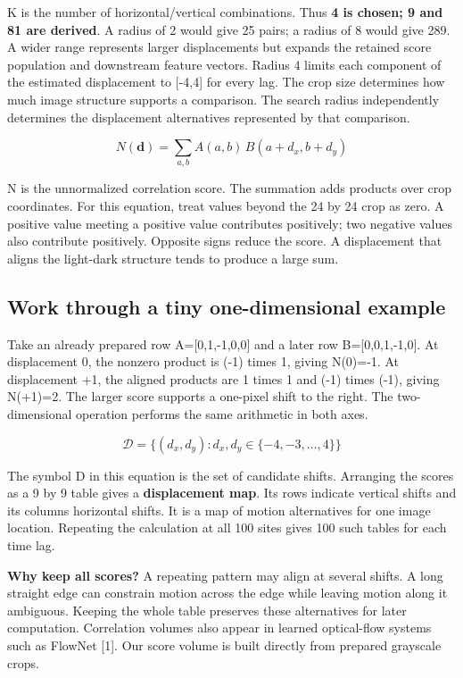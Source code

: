 \documentclass[11pt,letterpaper]{article}
\begin{document}
K is the number of horizontal/\allowbreak{}vertical combinations. Thus \textbf{4 is chosen; 9 and 81 are derived}. A radius of 2 would give 25 pairs; a radius of 8 would give 289. A wider range represents larger displacements but expands the retained score population and downstream feature vectors. Radius 4 limits each component of the estimated displacement to [-4,4] for every lag. The crop size determines how much image structure supports a comparison. The search radius independently determines the displacement alternatives represented by that comparison.


\begin{equation}N(\mathbf d)=\sum_{a,b} A(a,b)\,B(a+d_x,b+d_y)\end{equation}

N is the unnormalized correlation score. The summation adds products over crop coordinates. For this equation, treat values beyond the 24 by 24 crop as zero. A positive value meeting a positive value contributes positively; two negative values also contribute positively. Opposite signs reduce the score. A displacement that aligns the light-dark structure tends to produce a large sum.


\subsection*{Work through a tiny one-dimensional example}

Take an already prepared row A=[0,1,-1,0,0] and a later row B=[0,0,1,-1,0]. At displacement 0, the nonzero product is (-1) times 1, giving N(0)=-1. At displacement +1, the aligned products are 1 times 1 and (-1) times (-1), giving N(+1)=2. The larger score supports a one-pixel shift to the right. The two-dimensional operation performs the same arithmetic in both axes.


\begin{equation}\mathcal D=\{(d_x,d_y):d_x,d_y\in\{-4,-3,\ldots,4\}\}\end{equation}

The symbol D in this equation is the set of candidate shifts. Arranging the scores as a 9 by 9 table gives a \textbf{displacement map}. Its rows indicate vertical shifts and its columns horizontal shifts. It is a map of motion alternatives for one image location. Repeating the calculation at all 100 sites gives 100 such tables for each time lag.


\textbf{Why keep all scores?} A repeating pattern may align at several shifts. A long straight edge can constrain motion across the edge while leaving motion along it ambiguous. Keeping the whole table preserves these alternatives for later computation. Correlation volumes also appear in learned optical-flow systems such as FlowNet [1]. Our score volume is built directly from prepared grayscale crops.
\end{document}
